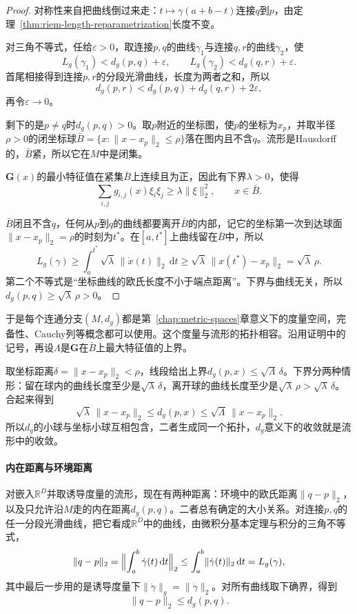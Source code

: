 \begin{proof}
对称性来自把曲线倒过来走：$t\mapsto\gamma(a+b-t)$连接$q$到$p$，由定理~\ref{thm:riem-length-reparametrization}长度不变。

对三角不等式，任给$\varepsilon>0$，取连接$p,q$的曲线$\gamma_1$与连接$q,r$的曲线$\gamma_2$，使
\[
L_g(\gamma_1)<d_g(p,q)+\varepsilon,\qquad L_g(\gamma_2)<d_g(q,r)+\varepsilon .
\]
首尾相接得到连接$p,r$的分段光滑曲线，长度为两者之和，所以
\[
d_g(p,r)<d_g(p,q)+d_g(q,r)+2\varepsilon ,
\]
再令$\varepsilon\to0$。

剩下的是$p\neq q$时$d_g(p,q)>0$。取$p$附近的坐标图，使$p$的坐标为$x_p$，并取半径$\rho>0$的闭坐标球$\bar B=\{x:\lVert x-x_p\rVert_2\leq\rho\}$落在图内且不含$q$。流形是Hausdorff的，$\bar B$紧，所以它在$M$中是闭集。

$\bm G(x)$的最小特征值在紧集$\bar B$上连续且为正，因此有下界$\lambda>0$，使得
\[
\sum_{i,j}g_{i,j}(x)\xi_i\xi_j\geq\lambda\lVert\xi\rVert_2^2,\qquad x\in\bar B .
\]

$\bar B$闭且不含$q$，任何从$p$到$q$的曲线都要离开$\bar B$的内部，记它的坐标第一次到达球面$\lVert x-x_p\rVert_2=\rho$的时刻为$t^\ast$。在$[a,t^\ast]$上曲线留在$\bar B$中，所以
\[
L_g(\gamma)\geq\int_a^{t^\ast}\sqrt\lambda\,\lVert\dot x(t)\rVert_2\,\mathrm dt\geq\sqrt\lambda\,\bigl\lVert x(t^\ast)-x_p\bigr\rVert_2=\sqrt\lambda\,\rho .
\]
第二个不等式是“坐标曲线的欧氏长度不小于端点距离”。下界与曲线无关，所以$d_g(p,q)\geq\sqrt\lambda\,\rho>0$。
\end{proof}

于是每个连通分支$(M,d_g)$都是第~\ref{chap:metric-spaces}章意义下的度量空间，完备性、Cauchy列等概念都可以使用。这个度量与流形的拓扑相容。沿用证明中的记号，再设$\Lambda$是$\bm G$在$\bar B$上最大特征值的上界。

取坐标距离$\delta=\lVert x-x_p\rVert_2<\rho$，线段给出上界$d_g(p,x)\leq\sqrt\Lambda\,\delta$。下界分两种情形：留在球内的曲线长度至少是$\sqrt\lambda\,\delta$，离开球的曲线长度至少是$\sqrt\lambda\,\rho>\sqrt\lambda\,\delta$。合起来得到
\[
\sqrt\lambda\,\lVert x-x_p\rVert_2\leq d_g(p,x)\leq\sqrt\Lambda\,\lVert x-x_p\rVert_2 .
\]
所以$d_g$的小球与坐标小球互相包含，二者生成同一个拓扑，$d_g$意义下的收敛就是流形中的收敛。

\paragraph{内在距离与环境距离}
对嵌入$\mathbb R^D$并取诱导度量的流形，现在有两种距离：环境中的欧氏距离$\lVert q-p\rVert_2$，以及只允许沿$M$走的内在距离$d_g(p,q)$。二者总有确定的大小关系。对连接$p,q$的任一分段光滑曲线，把它看成$\mathbb R^D$中的曲线，由微积分基本定理与积分的三角不等式，
\[
\lVert q-p\rVert_2=\Bigl\lVert\int_a^b\dot\gamma(t)\,\mathrm dt\Bigr\rVert_2\leq\int_a^b\lVert\dot\gamma(t)\rVert_2\,\mathrm dt=L_g(\gamma),
\]
其中最后一步用的是诱导度量下$\lVert\dot\gamma\rVert_g=\lVert\dot\gamma\rVert_2$。对所有曲线取下确界，得到
\begin{equation}
\lVert q-p\rVert_2\leq d_g(p,q).
\label{eq:riem-ambient-vs-intrinsic}
\end{equation}

